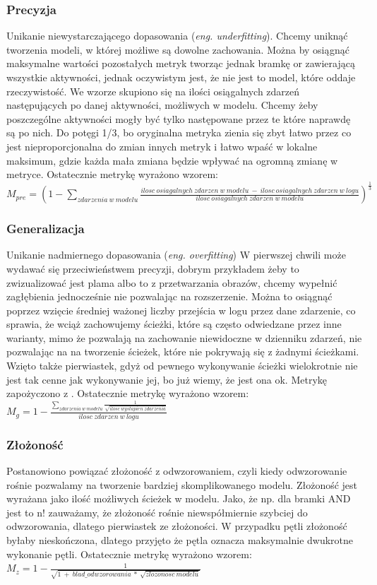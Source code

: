 \subsubsection{Precyzja} \cite{precision-calculation}
Unikanie niewystarczającego dopasowania (\textit{eng. underfitting}). Chcemy uniknąć tworzenia modeli, w której możliwe są dowolne zachowania. Można by osiągnąć maksymalne wartości pozostałych metryk tworząc jednak bramkę or zawierającą wszystkie aktywności, jednak oczywistym jest, że nie jest to model, które oddaje rzeczywistość. We wzorze skupiono się na ilości osiągalnych zdarzeń następujących po danej aktywności, możliwych w modelu. Chcemy żeby poszczególne aktywności mogły być tylko następowane przez te które naprawdę są po nich. Do potęgi 1/3, bo oryginalna metryka zienia się zbyt łatwo przez co jest nieproporcjonalna do zmian innych metryk i łatwo wpaść w lokalne maksimum, gdzie każda mała zmiana będzie wpływać na ogromną zmianę w metryce.  Ostatecznie metrykę wyrażono wzorem: \newline
$M_{pre} = (1 - \sum_{zdarzenia\ w\ modelu} \frac{ilosc\ osiagalnych\ zdarzen\ w\ modelu\ -\ ilosc\ osiagalnych\ zdarzen\ w\ logu}{ilosc\ osiagalnych\ zdarzen\ w\ modelu})^{\frac{1}{3}} $
\subsubsection{Generalizacja}
Unikanie nadmiernego dopasowania (\textit{eng. overfitting})
W pierwszej chwili może wydawać się przeciwieństwem precyzji, dobrym przykładem żeby to zwizualizować jest plama albo to z przetwarzania obrazów, chcemy wypełnić zagłębienia jednocześnie nie pozwalając na rozszerzenie. Można to osiągnąć poprzez wzięcie średniej ważonej liczby przejścia w logu przez dane zdarzenie, co sprawia, że wciąż zachowujemy ścieżki, które są często odwiedzane przez inne warianty, mimo że pozwalają na zachowanie niewidoczne w dzienniku zdarzeń, nie pozwalając na na tworzenie ścieżek, które nie pokrywają się z żadnymi ścieżkami. Wzięto także pierwiastek, gdyż od pewnego wykonywanie ścieżki wielokrotnie nie jest tak cenne jak wykonywanie jej, bo już wiemy, że jest ona ok. Metrykę zapożyczono z \cite{qd-in-discovery}. Ostatecznie metrykę wyrażono wzorem: \newline
$M_g = 1 - \frac{\sum_{zdarzenia\ w\ modelu} \frac{1}{\sqrt{ilosc\ wystapien\ zdarzenia}}}{ilosc\ zdarzen\ w\ logu} $
\subsubsection{Złożoność}
Postanowiono powiązać złożoność z odwzorowaniem, czyli kiedy odwzorowanie rośnie pozwalamy na tworzenie bardziej skomplikowanego modelu. Złożoność jest wyrażana jako ilość możliwych ścieżek w modelu. Jako, że np. dla bramki AND jest to n! zauważamy, że złożoność rośnie niewspółmiernie szybciej do odwzorowania, dlatego pierwiastek ze złożoności. W przypadku pętli złożoność byłaby nieskończona, dlatego przyjęto że pętla oznacza maksymalnie dwukrotne wykonanie pętli. Ostatecznie metrykę wyrażono wzorem: \newline
$M_z = 1 - \frac{1}{\sqrt{1\ +\ blad\_odwzorowania\ *\ \sqrt{zlozonosc\ modelu}}} $

